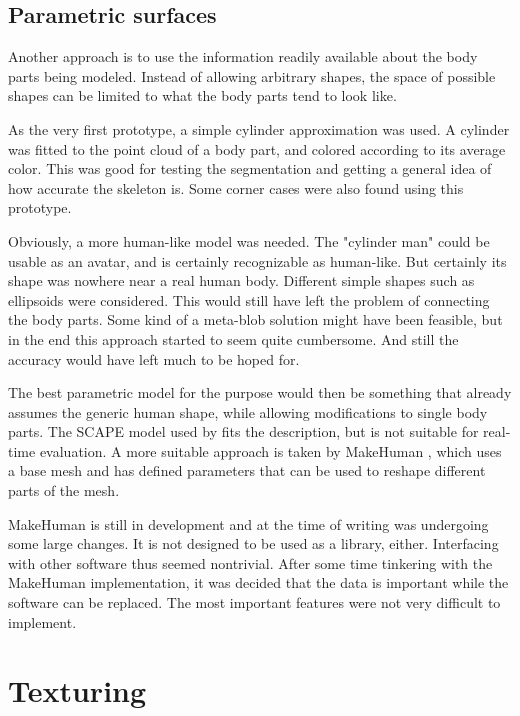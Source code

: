 \subsection{Parametric surfaces}

Another approach is to use the information readily available about the body parts being modeled. Instead of allowing arbitrary shapes, the space of possible shapes can be limited to what the body parts tend to look like.

As the very first prototype, a simple cylinder approximation was used. A cylinder was fitted to the point cloud of a body part, and colored according to its average color. This was good for testing the segmentation and getting a general idea of how accurate the skeleton is. Some corner cases were also found using this prototype. 

Obviously, a more human-like model was needed. The "cylinder man" could be usable as an avatar, and is certainly recognizable as human-like. But certainly its shape was nowhere near a real human body. Different simple shapes such as ellipsoids were considered. This would still have left the problem of connecting the body parts. Some kind of a meta-blob solution might have been feasible, but in the end this approach started to seem quite cumbersome. And still the accuracy would have left much to be hoped for.

The best parametric model for the purpose would then be something that already assumes the generic human shape, while allowing  modifications to single body parts. The SCAPE model \citep{anguelov2005scape} used by \citet{weiss2011home} fits the description, but is not suitable for real-time evaluation. A more suitable approach is taken by MakeHuman \citep{makehuman}, which uses a base mesh and has defined parameters that can be used to reshape different parts of the mesh.

MakeHuman is still in development and at the time of writing was undergoing some large changes. It is not designed to be used as a library, either. Interfacing with other software thus seemed nontrivial. After some time tinkering with the MakeHuman implementation, it was decided that the data is important while the software can be replaced. The most important features were not very difficult to implement.


\section{Texturing}



